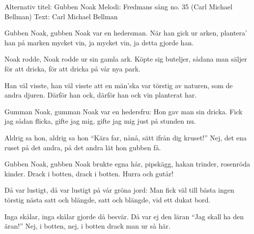 \begin{song}
\begin{songmeta}
Alternativ titel: Gubben Noak
Melodi: Fredmans sång no. 35 (Carl Michael Bellman)
Text: Carl Michael Bellman
\end{songmeta}

\begin{songtext}
Gubben Noak, gubben Noak
var en hedersman.
När han gick ur arken,
plantera' han på marken
mycket vin, ja mycket vin, ja
detta gjorde han.

Noak rodde, Noak rodde
ur sin gamla ark.
Köpte sig buteljer,
sådana man säljer
för att dricka, för att dricka
på vår nya park.

Han väl visste, han väl visste
att en män'ska var
törstig av naturen,
som de andra djuren.
Därför han ock, därför han ock
vin planterat har.

Gumman Noak, gumman Noak
var en hedersfru:
Hon gav man sin dricka.
Fick jag sådan flicka,
gifte jag mig, gifte jag mig
just på stunden nu.

Aldrig sa hon, aldrig sa hon
\textquotedblleft{}Kära far, nånå,
sätt ifrån dig kruset!\textquotedblright{}
Nej, det ena ruset
på det andra, på det andra
lät hon gubben få.

Gubben Noak, gubben Noak
brukte egna hår,
pipskägg, hakan trinder,
rosenröda kinder.
Drack i botten, drack i botten.
Hurra och gutår!

Då var lustigt, då var lustigt
på vår gröna jord:
Man fick väl till bästa
ingen törstig nästa
satt och blängde, satt och blängde,
vid ett dukat bord.

Inga skålar, inga skålar
gjorde då besvär.
Då var ej den läran
\textquotedblleft{}Jag skall ha den äran!\textquotedblright{}
Nej, i botten, nej, i botten
drack man ur så här.
\end{songtext}
\end{song}
